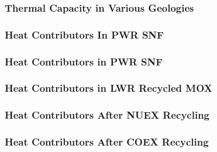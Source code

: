 
\begin{frame}[ctb!]
  \frametitle{Thermal Capacity in Various Geologies}
\footnotesize{
  
}
\end{frame}

\begin{frame}[ctb!]
  \frametitle{Heat Contributors In PWR SNF}
\footnotesize{
  
}
\end{frame}

\begin{frame}[ctb!]
  \frametitle{Heat Contributors in PWR SNF}
\footnotesize{
  
}
\end{frame}
\begin{frame}[ctb!]
  \frametitle{Heat Contributors in LWR Recycled MOX}
\footnotesize{
  
}
\end{frame}
\begin{frame}[ctb!]
  \frametitle{Heat Contributors After NUEX Recycling}
\footnotesize{
  
}
\end{frame}

\begin{frame}[ctb!]
  \frametitle{Heat Contributors After COEX Recycling}
\footnotesize{
  
}
\end{frame}


